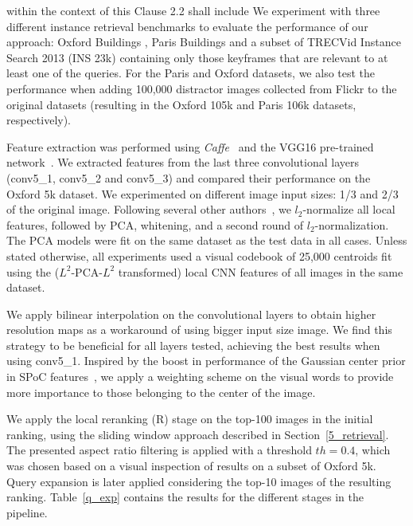 \documentclass{sig-arxiv}
\begin{document}
within the context of this Clause 2.2 shall include %
We experiment with three different instance retrieval benchmarks to evaluate the performance of our approach: Oxford Buildings \cite{philbin2007object}, Paris Buildings \cite{paris6k} and a subset of TRECVid Instance Search 2013 (INS 23k) \cite{trecvid} containing only those keyframes that are relevant to at least one of the queries. For the Paris and Oxford datasets, we also test the performance when adding 100,000 distractor images collected from Flickr to the original datasets (resulting in the Oxford 105k and Paris 106k datasets, respectively). 

Feature extraction was performed using \emph{Caffe}~\cite{caffe} and the VGG16 pre-trained network~\cite{vgg}. We extracted features from the last three convolutional layers (conv5\_1, conv5\_2 and conv5\_3) and compared their performance on the Oxford 5k dataset. We experimented on different image input sizes: 1/3 and 2/3 of the original image. Following several other authors~\cite{babenko2015,kalantidis2015}, we $l_2$-normalize all local features, followed by PCA, whitening, and a second round of $l_2$-normalization. The PCA models were fit on the same dataset as the test data in all cases. Unless stated otherwise, all experiments used a visual codebook of 25,000 centroids fit using the ($L^2$-PCA-$L^2$ transformed) local CNN features of all images in the same dataset.

We apply bilinear interpolation on the convolutional layers to obtain higher resolution maps as a workaround of using bigger input size image. We find this strategy to be beneficial for all layers tested, achieving the best results when using conv5\_1. Inspired by the boost in performance of the Gaussian center prior in SPoC features~\cite{babenko2015}, we apply a weighting scheme on the visual words to provide more importance to those belonging to the center of the image. 

We apply the local reranking (R) stage on the top-100 images in the initial ranking, using the sliding window approach described in Section~\ref{5_retrieval}. 
The presented aspect ratio filtering is applied with a threshold $th = 0.4$, which was chosen based on a visual inspection of results on a subset of Oxford 5k. 
Query expansion is later applied considering the top-10 images of the resulting ranking. 
Table~\ref{q_exp} contains the results for the different stages in the pipeline.
\end{document}
